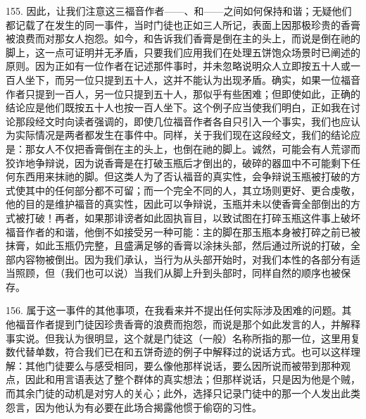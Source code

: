 155. 因此，让我们注意这三福音作者——、和——之间如何保持和谐；无疑他们都记载了在发生的同一事件，当时门徒也正如三人所记，表面上因那极珍贵的香膏被浪费而对那女人抱怨。如今，和告诉我们香膏是倒在主的头上，而说是倒在祂的脚上，这一点可证明并无矛盾，只要我们应用我们在处理五饼饱众场景时已阐述的原则。因为正如有一位作者在记述那件事时，并未忽略说明众人立即按五十人或一百人坐下，而另一位只提到五十人，这并不能认为出现矛盾。确实，如果一位福音作者只提到一百人，另一位只提到五十人，那似乎有些困难；但即使如此，正确的结论应是他们既按五十人也按一百人坐下。这个例子应当使我们明白，正如我在讨论那段经文时向读者强调的，即使几位福音作者各自只引入一个事实，我们也应认为实际情况是两者都发生在事件中。同样，关于我们现在这段经文，我们的结论应是：那女人不仅把香膏倒在主的头上，也倒在祂的脚上。诚然，可能会有人荒谬而狡诈地争辩说，因为说香膏是在打破玉瓶后才倒出的，破碎的器皿中不可能剩下任何东西用来抹祂的脚。但这类人为了否认福音的真实性，会争辩说玉瓶被打破的方式使其中的任何部分都不可留；而一个完全不同的人，其立场则更好、更合虔敬，他的目的是维护福音的真实性，因此可以争辩说，玉瓶并未以使香膏全部倒出的方式被打破！再者，如果那诽谤者如此固执盲目，以致试图在打碎玉瓶这件事上破坏福音作者的和谐，他倒不如接受另一种可能：主的脚在那玉瓶本身被打碎之前已被抹膏，如此玉瓶仍完整，且盛满足够的香膏以涂抹头部，然后通过所说的打破，全部内容物被倒出。因为我们承认，当行为从头部开始时，对我们本性的各部分有适当照顾，但（我们也可以说）当我们从脚上升到头部时，同样自然的顺序也被保存。\par

156. 属于这一事件的其他事项，在我看来并不提出任何实际涉及困难的问题。其他福音作者提到门徒因珍贵香膏的浪费而抱怨，而说是那个如此发言的人，并解释事实说。但我认为很明显，这个就是门徒这（一般）名称所指的那一位，这里用复数代替单数，符合我们已在和五饼奇迹的例子中解释过的说话方式。也可以这样理解：其他门徒要么与感受相同，要么像他那样说话，要么因所说而被带到那种观点，因此和用言语表达了整个群体的真实想法；但那样说话，只是因为他是个贼，而其余门徒的动机是对穷人的关心；此外，选择只记录门徒中的那一个人发出此类怨言，因为他认为有必要在此场合揭露他惯于偷窃的习性。\par


